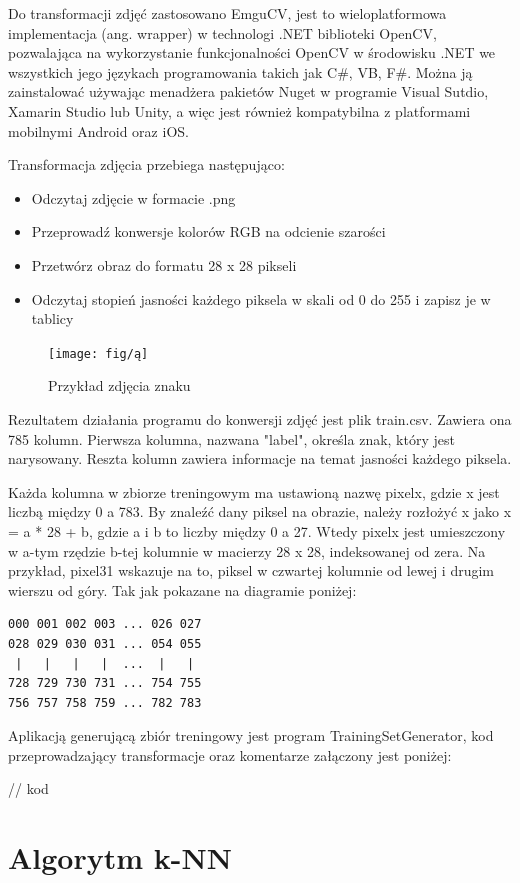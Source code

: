 \documentclass[brudnopis]{xmgr}
\begin{document}
Do transformacji zdjęć zastosowano EmguCV, jest to wieloplatformowa implementacja (ang. wrapper) w technologi .NET biblioteki OpenCV, pozwalająca na wykorzystanie funkcjonalności OpenCV w środowisku .NET we wszystkich jego językach programowania takich jak C\#, VB, F\#. Można ją zainstalować używając menadżera pakietów Nuget w programie Visual Sutdio, Xamarin Studio lub Unity, a więc jest również kompatybilna z platformami mobilnymi Android oraz iOS.

Transformacja zdjęcia przebiega następująco:
\begin{itemize}
\item
Odczytaj zdjęcie w formacie .png
\item
Przeprowadź konwersje kolorów RGB na odcienie szarości
\item
Przetwórz obraz do formatu 28 x 28 pikseli
\item
Odczytaj stopień jasności każdego piksela w skali od 0 do 255 i zapisz je w tablicy
\end{itemize}

\begin{figure}[!tbh]
\centering
\texttt{[image: fig/ą]}
\caption{Przykład zdjęcia znaku}
\end{figure}
Rezultatem działania programu do konwersji zdjęć jest plik train.csv. Zawiera ona 785 kolumn. Pierwsza kolumna, nazwana "label", określa znak, który jest narysowany. Reszta kolumn zawiera informacje na temat jasności każdego piksela.

Każda kolumna w zbiorze treningowym ma ustawioną nazwę pixelx, gdzie x jest liczbą między 0 a 783. By znaleźć dany piksel na obrazie, należy rozłożyć x jako x = a * 28 + b, gdzie a i b to liczby między 0 a 27. Wtedy pixelx jest umieszczony w a-tym rzędzie b-tej kolumnie w macierzy 28 x 28, indeksowanej od zera. Na przykład, pixel31 wskazuje na to, piksel w czwartej kolumnie od lewej i drugim wierszu od góry. Tak jak pokazane na diagramie poniżej:

\begin{lstlisting}
000 001 002 003 ... 026 027
028 029 030 031 ... 054 055
 |   |   |   |  ...  |   |
728 729 730 731 ... 754 755
756 757 758 759 ... 782 783 
\end{lstlisting} 

Aplikacją generującą zbiór treningowy jest program TrainingSetGenerator, kod przeprowadzający transformacje oraz komentarze załączony jest poniżej:

// kod

\section{Algorytm k-NN}
\end{document}
